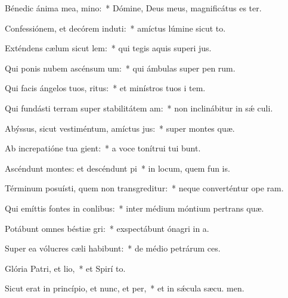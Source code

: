 \item Bénedic ánima mea, mino:~* Dómine, Deus meus, magnificátus es ter.
\item Confessiónem, et decórem induti:~* amíctus lúmine sicut to.
\item Exténdens cælum sicut lem:~* qui tegis aquis superi jus.
\item Qui ponis nubem ascénsum um:~* qui ámbulas super pen rum.
\item Qui facis ángelos tuos, ritus:~* et minístros tuos i tem.
\item Qui fundásti terram super stabilitátem am:~* non inclinábitur in sǽ culi.
\item Abýssus, sicut vestiméntum, amíctus jus:~* super montes  quæ.
\item Ab increpatióne tua gient:~* a voce tonítrui tui bunt.
\item Ascéndunt montes: et descéndunt pi~* in locum, quem fun is.
\item Términum posuísti, quem non transgreditur:~* neque converténtur ope ram.
\item Qui emíttis fontes in conlibus:~* inter médium móntium pertrans quæ.
\item Potábunt omnes béstiæ gri:~* exspectábunt ónagri in  a.
\item Super ea vólucres cæli habibunt:~* de médio petrárum  ces.
\item Glória Patri, et lio,~* et Spirí to.
\item Sicut erat in princípio, et nunc, et per,~* et in sǽcula sæcu. men.
